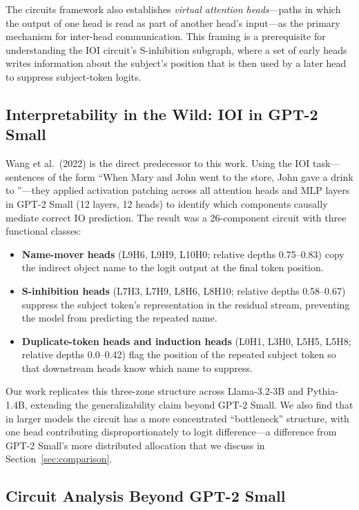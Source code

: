 \documentclass[11pt,a4paper]{article}
\begin{document}
The circuits framework also establishes \emph{virtual attention heads}---paths in
which the output of one head is read as part of another head's input---as the primary
mechanism for inter-head communication. This framing is a prerequisite for
understanding the IOI circuit's S-inhibition subgraph, where a set of early heads
writes information about the subject's position that is then used by a later head to
suppress subject-token logits.

\subsection{Interpretability in the Wild: IOI in GPT-2 Small}

Wang et al.\ (2022) \citep{wang2022interpretability} is the direct predecessor to this
work. Using the IOI task---sentences of the form ``When Mary and John went to the
store, John gave a drink to \underline{\phantom{Mary}}''---they applied activation
patching across all attention heads and MLP layers in GPT-2 Small (12 layers, 12
heads) to identify which components causally mediate correct IO prediction. The result
was a 26-component circuit with three functional classes:

\begin{itemize}
  \item \textbf{Name-mover heads} (L9H6, L9H9, L10H0; relative depths 0.75--0.83)
    copy the indirect object name to the logit output at the final token position.
  \item \textbf{S-inhibition heads} (L7H3, L7H9, L8H6, L8H10; relative depths
    0.58--0.67) suppress the subject token's representation in the residual stream,
    preventing the model from predicting the repeated name.
  \item \textbf{Duplicate-token heads and induction heads} (L0H1, L3H0, L5H5, L5H8;
    relative depths 0.0--0.42) flag the position of the repeated subject token so
    that downstream heads know which name to suppress.
\end{itemize}

Our work replicates this three-zone structure across Llama-3.2-3B and Pythia-1.4B,
extending the generalizability claim beyond GPT-2 Small. We also find that in larger
models the circuit has a more concentrated ``bottleneck'' structure, with one head
contributing disproportionately to logit difference---a difference from GPT-2 Small's
more distributed allocation that we discuss in Section~\ref{sec:comparison}.

\subsection{Circuit Analysis Beyond GPT-2 Small}
\label{sec:related-scale}
\end{document}
